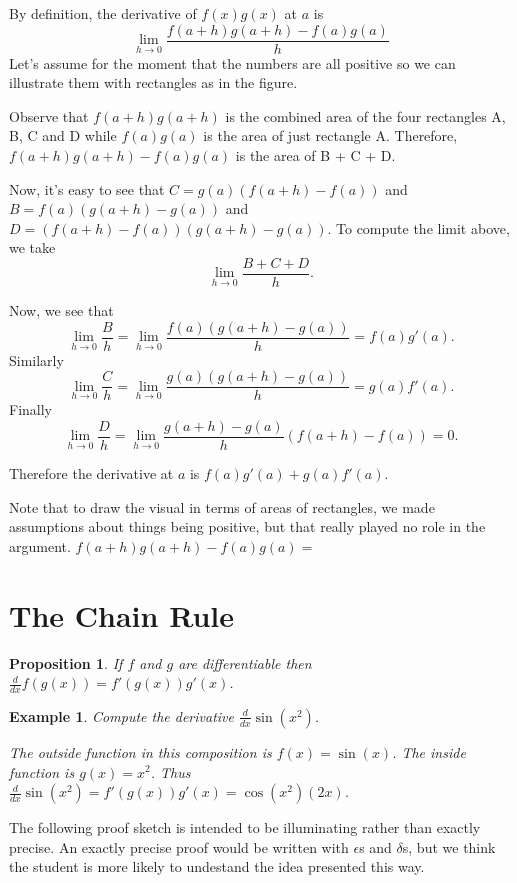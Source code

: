 \documentclass[11pt]{book}
\newtheorem{prop}{Proposition}
\newtheorem{example}{Example}
\numberwithin{example}{chapter}
\begin{document}
By definition, the derivative of $f(x)g(x)$ at $a$ is
$$\lim_{h\to 0}\frac{f(a+h)g(a+h)-f(a)g(a)}{h}$$
Let's assume for the moment that the numbers are all positive so we can illustrate them with rectangles as in the figure.

Observe that $f(a+h)g(a+h)$ is the combined area of the four rectangles A, B, C and D while $f(a)g(a)$ is the area of just rectangle A.  Therefore, $f(a+h)g(a+h)-f(a)g(a)$ is the area of B + C + D.  

Now, it's easy to see that $C=g(a)(f(a+h)-f(a))$ and $B=f(a)(g(a+h)-g(a))$ and $D=(f(a+h)-f(a))(g(a+h)-g(a))$.  To compute the limit above, we take 
$$\lim_{h\to 0} \frac{B+C+D}{h}.$$

Now, we see that 
$$\lim_{h\to 0} \frac{B}{h}=\lim_{h\to 0} \frac{f(a)(g(a+h)-g(a))}{h}=f(a)g'(a).$$
Similarly
$$\lim_{h\to 0} \frac{C}{h}=\lim_{h\to 0} \frac{g(a)(g(a+h)-g(a))}{h}=g(a)f'(a).$$
Finally
$$\lim_{h\to 0} \frac{D}{h}=\lim_{h\to 0} \frac{g(a+h)-g(a)}{h}(f(a+h)-f(a))=0.$$

Therefore the derivative at $a$ is $f(a)g'(a)+g(a)f'(a)$.

Note that to draw the visual in terms of areas of rectangles, we made assumptions about things being positive, but that really played no role in the argument.  $f(a+h)g(a+h)-f(a)g(a) = $

\section{The Chain Rule}


\begin{prop}
If $f$ and $g$ are differentiable then $\frac{d}{dx}f(g(x)) = f'(g(x))g'(x)$.
\end{prop}

\begin{example}

Compute the derivative $\frac{d}{dx}\sin(x^2)$.

The outside function in this composition is $f(x)=\sin(x)$.  The inside function is $g(x)=x^2$.  Thus $\frac{d}{dx}\sin(x^2) = f'(g(x))g'(x)= \cos(x^2)(2x)$.

\end{example}

The following proof sketch is intended to be illuminating rather than exactly precise.  An exactly precise proof would be written with $\epsilon$s and $\delta$s, but we think the student is more likely to undestand the idea presented this way.
\end{document}
